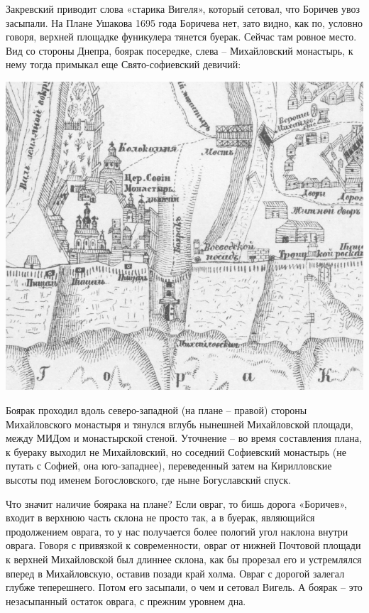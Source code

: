 Закревский приводит слова «старика Вигеля», который сетовал, что Боричев увоз засыпали. На Плане Ушакова 1695 года Боричева нет, зато видно, как по, условно говоря, верхней площадке фуникулера тянется буерак. Сейчас там ровное место. Вид со стороны Днепра, боярак посередке, слева – Михайловский монастырь, к нему тогда примыкал еще Свято-софиевский девичий:

\begin{center}
\includegraphics[width=\linewidth]{chast-colebanie-osnov/uvoz-borichev/1695-borichev.png}
\end{center}

Боярак проходил вдоль северо-западной (на плане – правой) стороны Михайловского монастыря и тянулся вглубь нынешней Михайловской площади, между МИДом и монастырской стеной. Уточнение – во время составления плана, к буераку выходил не Михайловский, но соседний Софиевский монастырь (не путать с Софией, она юго-западнее), переведенный затем на Кирилловские высоты под именем Богословского, где ныне Богуславский спуск.

Что значит наличие боярака на плане? Если овраг, то бишь дорога «Боричев», входит в верхнюю часть склона не просто так, а в буерак, являющийся продолжением оврага, то у нас получается более пологий угол наклона внутри оврага. Говоря с привязкой к современности, овраг от нижней Почтовой площади к верхней Михайловской был длиннее склона, как бы прорезал его и устремлялся вперед в Михайловскую, оставив позади край холма. Овраг с дорогой залегал глубже теперешнего. Потом его засыпали, о чем и сетовал Вигель. А боярак – это незасыпанный остаток оврага, с прежним уровнем дна.

